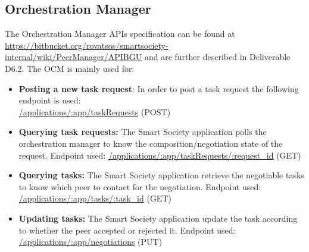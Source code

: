 \subsection{Orchestration Manager}
The Orchestration Manager APIs specification can be found at \url{https://bitbucket.org/rovatsos/smartsociety-internal/wiki/PeerManager/APIBGU} and are further described in Deliverable D6.2. The OCM is mainly used for:
\begin{itemize}
\item {\bf Posting a new task request}: In order to post a task request the following endpoint is used:\\
	\url{/applications/:app/taskRequests} (\textsc{POST})
\item {\bf Querying task requests:} The Smart Society application polls the orchestration manager to know the composition/negotiation state of the request. Endpoint used:
  \url{/applications/:app/taskRequests/:request_id} (\textsc{GET})
\item {\bf Querying tasks:} The Smart Society application retrieve the negotiable tasks to know which peer to contact for the negotiation. Endpoint used:
  \url{/applications/:app/tasks/:task_id} (\textsc{GET})
\item {\bf Updating tasks:} The Smart Society application update the task according to whether the peer accepted or rejected it. Endpoint used:
  \url{/applications/:app/negotiations} (\textsc{PUT})
  
\end{itemize}
